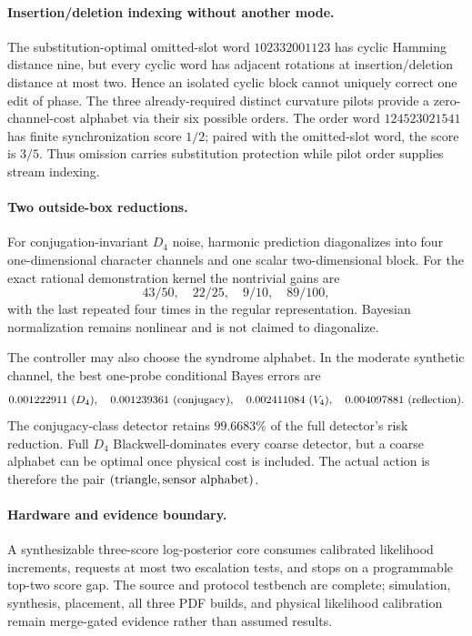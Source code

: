 \paragraph{Insertion/deletion indexing without another mode.}
The substitution-optimal omitted-slot word $102332001123$ has cyclic Hamming distance
nine, but every cyclic word has adjacent rotations at insertion/deletion distance at most
two.  Hence an isolated cyclic block cannot uniquely correct one edit of phase.  The
three already-required distinct curvature pilots provide a zero-channel-cost alphabet via
their six possible orders.  The order word $124523021541$ has finite synchronization
score $1/2$; paired with the omitted-slot word, the score is $3/5$.  Thus omission carries
substitution protection while pilot order supplies stream indexing.

\paragraph{Two outside-box reductions.}
For conjugation-invariant $D_4$ noise, harmonic prediction diagonalizes into four
one-dimensional character channels and one scalar two-dimensional block.  For the exact
rational demonstration kernel the nontrivial gains are
\[
43/50,\quad22/25,\quad9/10,\quad89/100,
\]
with the last repeated four times in the regular representation.  Bayesian normalization
remains nonlinear and is not claimed to diagonalize.

The controller may also choose the syndrome alphabet.  In the moderate synthetic channel,
the best one-probe conditional Bayes errors are
\[
0.001222911\ (D_4),\quad0.001239361\ ({\rm conjugacy}),\quad
0.002411084\ (V_4),\quad0.004097881\ ({\rm reflection}).
\]
The conjugacy-class detector retains $99.6683\%$ of the full detector's risk reduction.
Full $D_4$ Blackwell-dominates every coarse detector, but a coarse alphabet can be optimal
once physical cost is included.  The actual action is therefore the pair
$(\hbox{triangle},\hbox{sensor alphabet})$.

\paragraph{Hardware and evidence boundary.}
A synthesizable three-score log-posterior core consumes calibrated likelihood increments,
requests at most two escalation tests, and stops on a programmable top-two score gap.  The
source and protocol testbench are complete; simulation, synthesis, placement, all three
PDF builds, and physical likelihood calibration remain merge-gated evidence rather than
assumed results.
